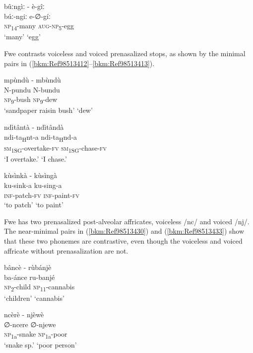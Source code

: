 \ea
\label{bkm:Ref98513391}
bûːngìː \tab   - \tab è-gîː\\
búː-ngiː  \tab\tab    e-∅-gíː\\
\textsc{np}\textsubscript{14}-many \tab\tab     \textsc{aug}-\textsc{np}\textsubscript{5}-egg\\
\glt ‘many’ \tab\tab      ‘egg’
\z

Fwe contrasts voiceless and voiced prenasalized stops, as shown by the minimal pairs in (\ref{bkm:Ref98513412}--\ref{bkm:Ref98513413}).

\ea
\label{bkm:Ref98513412}
mpùndù \tab   - \tab mbùndù\\
N-pundu  \tab\tab    N-bundu\\
\textsc{np}\textsubscript{9}-bush  \tab\tab    \textsc{np}\textsubscript{9}-dew\\
\glt ‘sandpaper raisin bush’ \tab ‘dew’
\z

\ea
ndìtântà  \tab  - \tab ndìtândà\\
ndi-ta\textsubscript{H}nt-a   \tab\tab   ndi-ta\textsubscript{H}nd-a\\
\textsc{sm}\textsubscript{1SG}-overtake-\textsc{fv} \tab\tab   \textsc{sm}\-\textsubscript{1SG}-chase-\textsc{fv}\\
\glt ‘I overtake.’  \tab\tab    ‘I chase.’
\z

\ea
\label{bkm:Ref98513413}
kùsìnkà   \tab - \tab kùsìngà\\
ku-sink-a  \tab\tab    ku-sing-a\\
\textsc{inf}-patch-\textsc{fv}  \tab\tab    \textsc{inf}-paint-\textsc{fv}\\
\glt ‘to patch’  \tab\tab    ‘to paint’
\z

Fwe has two prenasalized post-alveolar affricates, voiceless /nc/ and voiced /nj/. The near-minimal pairs in (\ref{bkm:Ref98513430}) and (\ref{bkm:Ref98513433}) show that these two phonemes are contrastive, even though the voiceless and voiced affricate without prenasalization are not.

\ea
\label{bkm:Ref98513430}
bâncè   \tab   - \tab rùbánjè\\
ba-ánce  \tab\tab    ru-banjé\\
\textsc{np}\-\textsubscript{2}-child  \tab\tab    \textsc{np}\textsubscript{11}-cannabis\\
\glt ‘children’  \tab\tab    ‘cannabis’
\z

\ea
\label{bkm:Ref98513433}
ncèrè  \tab    -  \tab njèwè\\
∅-ncere \tab\tab     ∅-njewe\\
\textsc{np}\textsubscript{1a}-snake   \tab\tab   \textsc{np}\-\textsubscript{1a}-poor\\
\glt ‘snake sp.’  \tab\tab    ‘poor person’
\z

